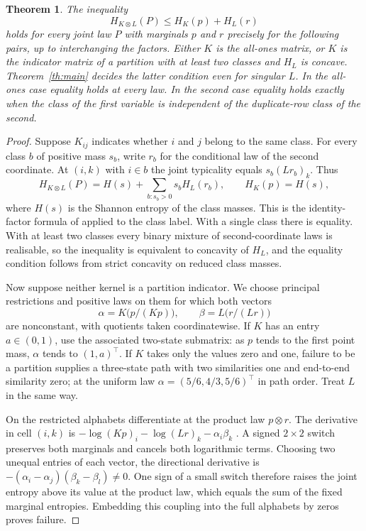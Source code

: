 \documentclass[11pt,a4paper]{article}
\newtheorem{theorem}{Theorem}
\theoremstyle{remark}
\begin{document}
\begin{theorem}\label{thm:subadd}
The inequality
\[
 H_{K\otimes L}(P)\le H_K(p)+H_L(r)
\]
holds for every joint law $P$ with marginals $p$ and $r$ precisely for the following pairs, up to interchanging the factors. Either $K$ is the all-ones matrix, or $K$ is the indicator matrix of a partition with at least two classes and $H_L$ is concave. Theorem~\ref{th:main} decides the latter condition even for singular $L$. In the all-ones case equality holds at every law. In the second case equality holds exactly when the class of the first variable is independent of the duplicate-row class of the second.
\end{theorem}

\begin{proof}
Suppose $K_{ij}$ indicates whether $i$ and $j$ belong to the same class. For every class $b$ of positive mass $s_b$, write $r_b$ for the conditional law of the second coordinate. At $(i,k)$ with $i\in b$ the joint typicality equals $s_b(Lr_b)_k$. Thus
\[
 H_{K\otimes L}(P)=H(s)+\sum_{b:s_b>0}s_b H_L(r_b),\qquad H_K(p)=H(s),
\]
where $H(s)$ is the Shannon entropy of the class masses. This is the identity-factor formula of \cite[Theorem 4]{gait} applied to the class label. With a single class there is equality. With at least two classes every binary mixture of second-coordinate laws is realisable, so the inequality is equivalent to concavity of $H_L$, and the equality condition follows from strict concavity on reduced class masses.

Now suppose neither kernel is a partition indicator. We choose principal restrictions and positive laws on them for which both vectors
\[
 \alpha=K\bigl(p/(Kp)\bigr),\qquad \beta=L\bigl(r/(Lr)\bigr)
\]
are nonconstant, with quotients taken coordinatewise. If $K$ has an entry $a\in(0,1)$, use the associated two-state submatrix: as $p$ tends to the first point mass, $\alpha$ tends to $(1,a)^\top$. If $K$ takes only the values zero and one, failure to be a partition supplies a three-state path with two similarities one and end-to-end similarity zero; at the uniform law $\alpha=(5/6,4/3,5/6)^\top$ in path order. Treat $L$ in the same way.

On the restricted alphabets differentiate at the product law $p\otimes r$. The derivative in cell $(i,k)$ is $-\log(Kp)_i-\log(Lr)_k-\alpha_i\beta_k$ \cite[proof of Theorem 11]{bavaud}. A signed $2\times2$ switch preserves both marginals and cancels both logarithmic terms. Choosing two unequal entries of each vector, the directional derivative is $-(\alpha_i-\alpha_j)(\beta_k-\beta_l)\ne0$. One sign of a small switch therefore raises the joint entropy above its value at the product law, which equals the sum of the fixed marginal entropies. Embedding this coupling into the full alphabets by zeros proves failure.
\end{proof}
\end{document}
